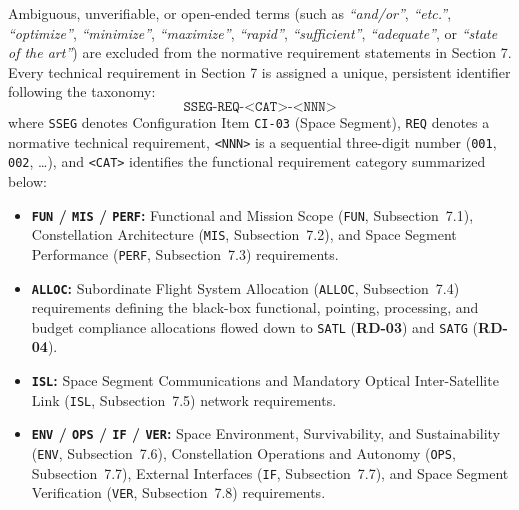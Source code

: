 Ambiguous, unverifiable, or open-ended terms (such as \emph{``and/or''}, \emph{``etc.''}, \emph{``optimize''}, \emph{``minimize''}, \emph{``maximize''}, \emph{``rapid''}, \emph{``sufficient''}, \emph{``adequate''}, or \emph{``state of the art''}) are excluded from the normative requirement statements in Section 7. Every technical requirement in Section 7 is assigned a unique, persistent identifier following the taxonomy:
\[
\texttt{SSEG-REQ-<CAT>-<NNN>}
\]
where \texttt{SSEG} denotes Configuration Item \texttt{CI-03} (Space Segment), \texttt{REQ} denotes a normative technical requirement, \texttt{<NNN>} is a sequential three-digit number (\texttt{001}, \texttt{002}, \dots), and \texttt{<CAT>} identifies the functional requirement category summarized below:
\begin{itemize}
    \item \textbf{\texttt{FUN} / \texttt{MIS} / \texttt{PERF}:} Functional and Mission Scope (\texttt{FUN}, Subsection~7.1), Constellation Architecture (\texttt{MIS}, Subsection~7.2), and Space Segment Performance (\texttt{PERF}, Subsection~7.3) requirements.
    \item \textbf{\texttt{ALLOC}:} Subordinate Flight System Allocation (\texttt{ALLOC}, Subsection~7.4) requirements defining the black-box functional, pointing, processing, and budget compliance allocations flowed down to \texttt{SATL} (\textbf{RD-03}) and \texttt{SATG} (\textbf{RD-04}).
    \item \textbf{\texttt{ISL}:} Space Segment Communications and Mandatory Optical Inter-Satellite Link (\texttt{ISL}, Subsection~7.5) network requirements.
    \item \textbf{\texttt{ENV} / \texttt{OPS} / \texttt{IF} / \texttt{VER}:} Space Environment, Survivability, and Sustainability (\texttt{ENV}, Subsection~7.6), Constellation Operations and Autonomy (\texttt{OPS}, Subsection~7.7), External Interfaces (\texttt{IF}, Subsection~7.7), and Space Segment Verification (\texttt{VER}, Subsection~7.8) requirements.
\end{itemize}
